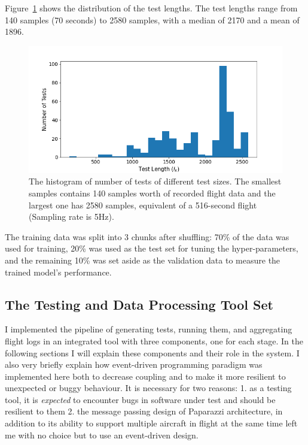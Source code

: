 Figure~\ref{fig:paparazzi_test_length} shows the distribution of the test lengths. The test lengths range from 140 samples (70 seconds) to 2580 samples, with a median of 2170 and a mean of 1896.
\begin{figure}
    \centering
    \includegraphics[width=\columnwidth]{RQ3-5_charts/test_lengths.png}
    \caption{The histogram of number of tests of different test sizes. The smallest samples contains 140 samples worth of recorded flight data and the largest one has 2580 samples, equivalent of a 516-second flight (Sampling rate is 5Hz). }
    \label{fig:paparazzi_test_length}
\end{figure}

The training data was split into 3 chunks after shuffling: 70\% of the data was used for training, 20\% was used as the test set for tuning the hyper-parameters, and the remaining 10\% was set aside as the validation data to measure the trained model's performance. 







\subsection{The Testing and Data Processing Tool Set}\label{section:fuzzing_tool}
I implemented the pipeline of generating tests, running them, and aggregating flight logs in an integrated tool with three components, one for each stage. In the following sections I will explain these components and their role in the system. I also very briefly explain how event-driven programming paradigm was implemented here both to decrease coupling and to make it more resilient to unexpected or buggy behaviour. It is necessary for two reasons: 1. as a testing tool, it is \textit{expected} to encounter bugs in software under test and should be resilient to them 2. the message passing design of Paparazzi architecture, in addition to its ability to support multiple aircraft in flight at the same time left me with no choice but to use an event-driven design.


